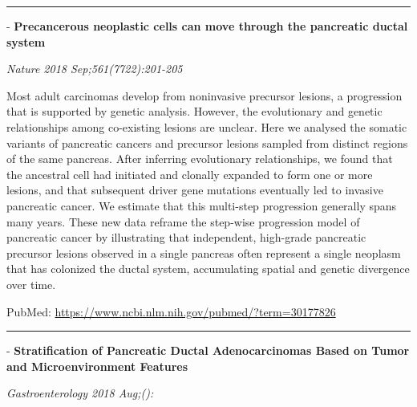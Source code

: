 \documentclass[]{article}
\begin{document}
\begin{center}\rule{0.5\linewidth}{\linethickness}\end{center}

 - \textbf{Precancerous neoplastic cells can move through the pancreatic
ductal system}

\emph{Nature 2018 Sep;561(7722):201-205}

Most adult carcinomas develop from noninvasive precursor lesions, a
progression that is supported by genetic analysis. However, the
evolutionary and genetic relationships among co-existing lesions are
unclear. Here we analysed the somatic variants of pancreatic cancers and
precursor lesions sampled from distinct regions of the same pancreas.
After inferring evolutionary relationships, we found that the ancestral
cell had initiated and clonally expanded to form one or more lesions,
and that subsequent driver gene mutations eventually led to invasive
pancreatic cancer. We estimate that this multi-step progression
generally spans many years. These new data reframe the step-wise
progression model of pancreatic cancer by illustrating that independent,
high-grade pancreatic precursor lesions observed in a single pancreas
often represent a single neoplasm that has colonized the ductal system,
accumulating spatial and genetic divergence over time.

PubMed: \url{https://www.ncbi.nlm.nih.gov/pubmed/?term=30177826}

{}

{}

\begin{center}\rule{0.5\linewidth}{\linethickness}\end{center}

 - \textbf{Stratification of Pancreatic Ductal Adenocarcinomas Based on
Tumor and Microenvironment Features}

\emph{Gastroenterology 2018 Aug;():}
\end{document}
